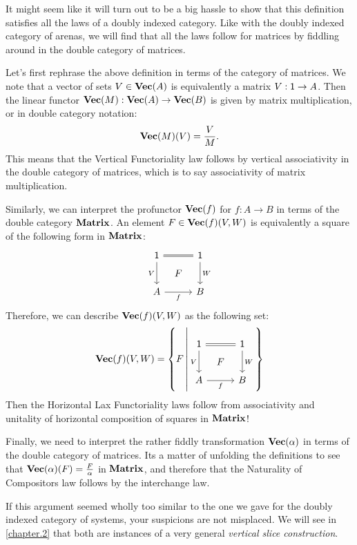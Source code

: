 \documentclass[DynamicalBook]{subfiles}
\begin{document}
It might seem like it will turn out to be a big hassle to show that this
definition satisfies all the laws of a doubly indexed category. Like with the
doubly indexed category of arenas, we will find that all the laws follow for
matrices by fiddling around in the double category of matrices.

Let's first rephrase the above definition in terms of the category of matrices.
We note that a vector of sets $V \in \textbf{Vec}(A)$ is equivalently a matrix $V :
\mathsf{1} \to A$. Then the linear functor $\textbf{Vec}(M) : \textbf{Vec}(A) \to
\textbf{Vec}(B)$ is given by matrix multiplication, or in double category notation:
$$\textbf{Vec}(M)(V) = \frac{V}{M}.$$
This means that the Vertical Functoriality law follows by vertical associativity
in the double category of matrices, which is to say associativity of matrix
multiplication.

Similarly, we can interpret the profunctor $\textbf{Vec}(f)$ for $f : A \to B$ in
terms of the double category $\textbf{Matrix}$. An element $F \in \textbf{Vec}(f)(V, W)$ is
equivalently a square of the following form in $\textbf{Matrix}$:
\[
        \begin{tikzcd}[sep=tiny]
          \ord{1} \ar[dd, "V"'] \ar[rr, equals] & & \ord{1} \ar[dd, "W"] \\
           & F & \\
          A \ar[rr, "f"'] & & B
        \end{tikzcd}
      \]
      Therefore, we can describe $\textbf{Vec}(f)(V, W)$ as the following set:
\[
\Cat{Vec}(f)(V, W) = \left\{ F \,\middle|
        \begin{tikzcd}[sep=tiny]
          \ord{1} \ar[dd, "V"'] \ar[rr, equals] & & \ord{1} \ar[dd, "W"] \\
           & F & \\
          A \ar[rr, "f"'] & & B
        \end{tikzcd}
  \right\}
\]
Then the Horizontal Lax Functoriality laws follow from associativity and unitality of
horizontal composition of squares in $\textbf{Matrix}$! 


Finally, we need to interpret the rather fiddly transformation
$\textbf{Vec}(\alpha)$ in terms of the double category of matrices. Its a matter of
unfolding the definitions to see that
$\textbf{Vec}(\alpha)(F) = \frac{F}{\alpha}$
in $\textbf{Matrix}$, and therefore that the Naturality of Compositors law follows
by the interchange law.

\begin{remark}
  If this argument seemed wholly too similar to the one we gave for the doubly
  indexed category of systems, your suspicions are not misplaced. We will see in
  \cref{chapter.2} that both are instances of a very general \emph{vertical
    slice construction}.
\end{remark}
\end{document}

